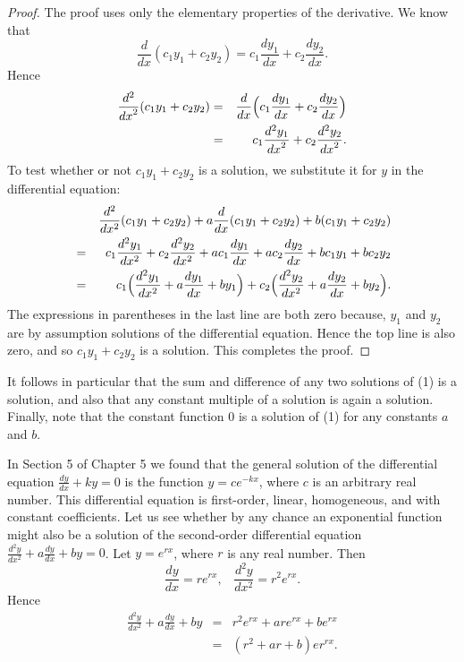 \begin{proof}
The proof uses only the elementary properties of the derivative. We know that
$$
\frac{d}{dx}(c_{1}y_{1} + c_{2}y_{2}) = c_{1} \frac{dy_1}{dx} + c_{2} \frac{dy_2}{dx}.
$$
Hence
\begin{eqnarray*}
\frac{d^2}{{dx}^2} (c_{1}y_{1} + c_{2}y_{2}) &=& \frac{d}{dx}\Bigl(c_{1} \frac{dy_1}{dx} + c_{2} \frac{dy_2}{dx}\Bigr) \\
&=& c_{1} \frac{d^{2}y_1}{{dx}^2} + c_{2} \frac{d^{2}y_2}{{dx}^2}.
\end{eqnarray*}
To test whether or not $c_{1}y_{1} + c_{2}y_{2}$ is a solution, 
we substitute it for $y$ in the differential equation:
\begin{eqnarray*}
&& \frac{d^{2}}{dx^2} (c_{1}y_{1} + c_{2}y_{2}) + a \frac{d}{dx} (c_{1}y_{1} + c_{2}y_{2}) + b(c_{1}y_{1} + c_{2}y_{2})\\
&=& c_{1} \frac{d^{2}y_1}{dx^2} + c_{2} \frac{d^{2}y_2}{dx^2} + ac_{1} \frac{dy_1}{dx} + ac_{2} \frac{dy_2}{ dx} + bc_{1}y_{1} + bc_{2}y_{2}\\
&=& c_{1}\Bigl(\frac{d^{2}y_1}{dx^2} + a \frac{dy_1}{dx} + by_1\Bigr) 
     + c_{2}\Bigl(\frac{d^{2}y_2}{dx^2} + a \frac{dy_2}{dx} + by_2\Bigr).
\end{eqnarray*}
The expressions in parentheses in the last line are both zero because, 
$y_1$ and $y_2$ are by assumption solutions of the differential equation. 
Hence the top line is also zero, and so $c_{1}y_{1} + c_{2}y_{2}$ is a solution. 
This completes the proof.
\end{proof}

It follows in particular that the sum and difference of any two solutions of (1) is a solution, 
and also that any constant multiple of a solution is again a solution. Finally, note that the 
constant function 0 is a solution of (1) for any constants $a$ and $b$.

In Section 5 of Chapter 5 we found that the general solution of the differential equation $\frac{dy}{dx} + ky = 0$ is the function $y = ce^{-kx}$, where $c$ is an arbitrary real number. 
This differential equation is first-order, linear, homogeneous, and with constant coefficients. 
Let us see whether by any chance an
exponential function might also be a solution of the second-order differential equation 
$\frac{d^{2}y}{dx^2} + a \frac{dy}{dx} + by = 0$. Let $y = e^{rx}$, where $r$ is any real number.
Then 
$$
\frac{dy}{dx} = re^{rx}, \;\;\; \frac{d^{2}y}{dx^2} = r^{2} e^{rx} .
$$
\noindent Hence
\begin{eqnarray*}
\frac{d^{2}y}{dx^2} + a \frac{dy}{dx} + by &=& r^{2}e^{rx} + are^{rx} + be^{rx} \\
&=& (r^2 + ar + b)er^{rx}.
\end{eqnarray*}


